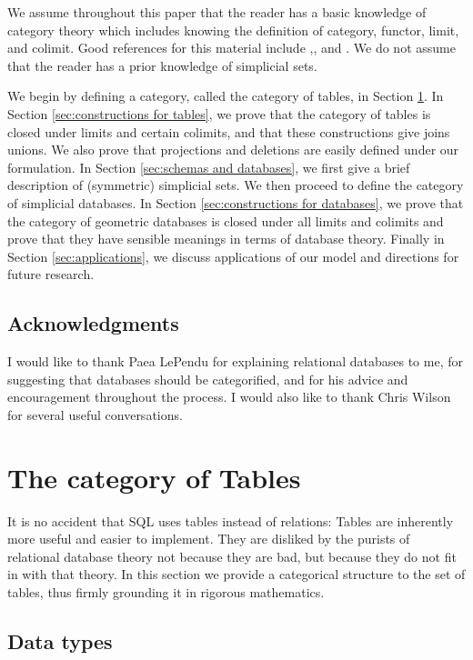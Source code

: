 \documentclass{amsart}
\begin{document}
We assume throughout this paper that the reader has a basic knowledge of category theory which includes knowing the definition of category, functor, limit, and colimit.  Good references for this material include \cite{Mac},\cite{BW}, and \cite{Bor1}.  We do not assume that the reader has a prior knowledge of simplicial sets.

We begin by defining a category, called the category of tables, in Section \ref{sec:tables}.  In Section \ref{sec:constructions for tables}, we prove that the category of tables is closed under limits and certain colimits, and that these constructions give joins unions.  We also prove that projections and deletions are easily defined under our formulation.  In Section \ref{sec:schemas and databases}, we first give a brief description of (symmetric) simplicial sets.  We then proceed to define the category of simplicial databases.  In Section \ref{sec:constructions for databases}, we prove that the category of geometric databases is closed under all limits and colimits and prove that they have sensible meanings in terms of database theory.  Finally in Section \ref{sec:applications}, we discuss applications of our model and directions for future research.

\subsection{Acknowledgments}

I would like to thank Paea LePendu for explaining relational databases to me, for suggesting that databases should be categorified, and for his advice and encouragement throughout the process.  I would also like to thank Chris Wilson for several useful conversations.

\section{The category of Tables}\label{sec:tables}

It is no accident that SQL uses tables instead of relations: Tables are inherently more useful and easier to implement.  They are disliked by the purists of relational database theory not because they are bad, but because they do not fit in with that theory.  In this section we provide a categorical structure to the set of tables, thus firmly grounding it in rigorous mathematics.  

\subsection{Data types}
\end{document}
